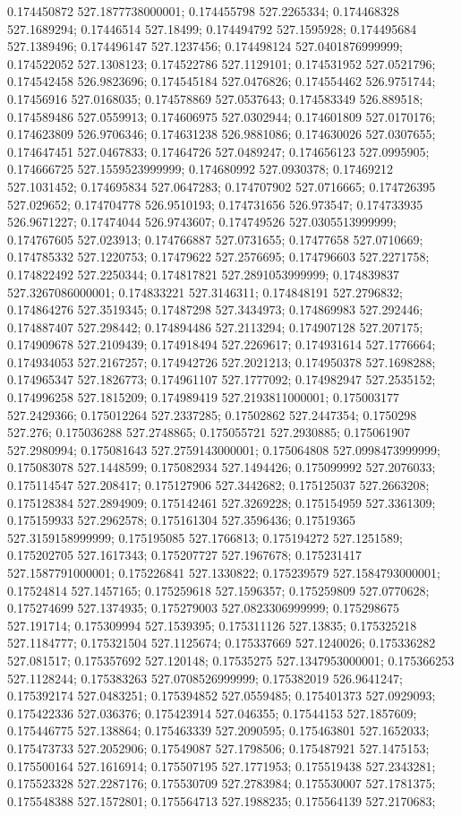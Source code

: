 0.174450872 527.1877738000001; 0.174455798 527.2265334; 0.174468328 527.1689294; 0.17446514 527.18499; 0.174494792 527.1595928; 0.174495684 527.1389496; 0.174496147 527.1237456; 0.174498124 527.0401876999999; 0.174522052 527.1308123; 0.174522786 527.1129101; 0.174531952 527.0521796; 0.174542458 526.9823696; 0.174545184 527.0476826; 0.174554462 526.9751744; 0.17456916 527.0168035; 0.174578869 527.0537643; 0.174583349 526.889518; 0.174589486 527.0559913; 0.174606975 527.0302944; 0.174601809 527.0170176; 0.174623809 526.9706346; 0.174631238 526.9881086; 0.174630026 527.0307655; 0.174647451 527.0467833; 0.17464726 527.0489247; 0.174656123 527.0995905; 0.174666725 527.1559523999999; 0.174680992 527.0930378; 0.17469212 527.1031452; 0.174695834 527.0647283; 0.174707902 527.0716665; 0.174726395 527.029652; 0.174704778 526.9510193; 0.174731656 526.973547; 0.174733935 526.9671227; 0.17474044 526.9743607; 0.174749526 527.0305513999999; 0.174767605 527.023913; 0.174766887 527.0731655; 0.17477658 527.0710669; 0.174785332 527.1220753; 0.17479622 527.2576695; 0.174796603 527.2271758; 0.174822492 527.2250344; 0.174817821 527.2891053999999; 0.174839837 527.3267086000001; 0.174833221 527.3146311; 0.174848191 527.2796832; 0.174864276 527.3519345; 0.17487298 527.3434973; 0.174869983 527.292446; 0.174887407 527.298442; 0.174894486 527.2113294; 0.174907128 527.207175; 0.174909678 527.2109439; 0.174918494 527.2269617; 0.174931614 527.1776664; 0.174934053 527.2167257; 0.174942726 527.2021213; 0.174950378 527.1698288; 0.174965347 527.1826773; 0.174961107 527.1777092; 0.174982947 527.2535152; 0.174996258 527.1815209; 0.174989419 527.2193811000001; 0.175003177 527.2429366; 0.175012264 527.2337285; 0.17502862 527.2447354; 0.1750298 527.276; 0.175036288 527.2748865; 0.175055721 527.2930885; 0.175061907 527.2980994; 0.175081643 527.2759143000001; 0.175064808 527.0998473999999; 0.175083078 527.1448599; 0.175082934 527.1494426; 0.175099992 527.2076033; 0.175114547 527.208417; 0.175127906 527.3442682; 0.175125037 527.2663208; 0.175128384 527.2894909; 0.175142461 527.3269228; 0.175154959 527.3361309; 0.175159933 527.2962578; 0.175161304 527.3596436; 0.17519365 527.3159158999999; 0.175195085 527.1766813; 0.175194272 527.1251589; 0.175202705 527.1617343; 0.175207727 527.1967678; 0.175231417 527.1587791000001; 0.175226841 527.1330822; 0.175239579 527.1584793000001; 0.17524814 527.1457165; 0.175259618 527.1596357; 0.175259809 527.0770628; 0.175274699 527.1374935; 0.175279003 527.0823306999999; 0.175298675 527.191714; 0.175309994 527.1539395; 0.175311126 527.13835; 0.175325218 527.1184777; 0.175321504 527.1125674; 0.175337669 527.1240026; 0.175336282 527.081517; 0.175357692 527.120148; 0.17535275 527.1347953000001; 0.175366253 527.1128244; 0.175383263 527.0708526999999; 0.175382019 526.9641247; 0.175392174 527.0483251; 0.175394852 527.0559485; 0.175401373 527.0929093; 0.175422336 527.036376; 0.175423914 527.046355; 0.17544153 527.1857609; 0.175446775 527.138864; 0.175463339 527.2090595; 0.175463801 527.1652033; 0.175473733 527.2052906; 0.17549087 527.1798506; 0.175487921 527.1475153; 0.175500164 527.1616914; 0.175507195 527.1771953; 0.175519438 527.2343281; 0.175523328 527.2287176; 0.175530709 527.2783984; 0.175530007 527.1781375; 0.175548388 527.1572801; 0.175564713 527.1988235; 0.175564139 527.2170683; 